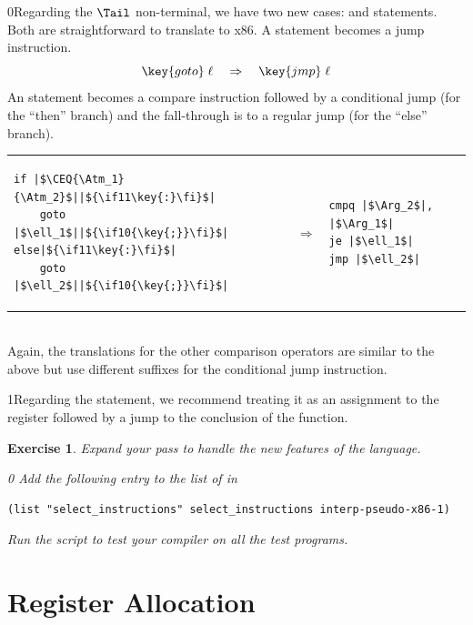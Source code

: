 \documentclass[7x10,nocrop]{TimesAPriori_MIT}%
\def\racketEd{0}
\def\pythonEd{1}
\def\edition{1}
\newcommand{\racket}[1]{{\if\edition\racketEd{#1}\fi}}
\newcommand{\python}[1]{{\if\edition\pythonEd #1\fi}}
\newtheorem{exercise}[theorem]{Exercise}
\begin{document}
\racket{Regarding the $\Tail$ non-terminal, we have two new cases:
  \key{goto} and \key{if} statements. Both are straightforward to
  translate to x86.}
%
A  statement becomes a jump instruction.
\[
\key{goto}\; \ell\racket{\key{;}} \quad \Rightarrow \quad \key{jmp}\;\ell
\]
%
An  statement becomes a compare instruction followed by a
conditional jump (for the ``then'' branch) and the fall-through is to
a regular jump (for the ``else'' branch).\\
\begin{tabular}{lll}
\begin{minipage}{0.4\textwidth}
\begin{lstlisting}
if |$\CEQ{\Atm_1}{\Atm_2}$||$\python{\key{:}}$|
    goto |$\ell_1$||$\racket{\key{;}}$|
else|$\python{\key{:}}$|
    goto |$\ell_2$||$\racket{\key{;}}$|
\end{lstlisting}
\end{minipage}
&
$\Rightarrow$
&
\begin{minipage}{0.4\textwidth}
\begin{lstlisting}
cmpq |$\Arg_2$|, |$\Arg_1$|
je |$\ell_1$|
jmp |$\ell_2$|
\end{lstlisting}
\end{minipage}
\end{tabular}  \\
Again, the translations for the other comparison operators are similar to the
above but use different suffixes for the conditional jump instruction.

\python{Regarding the  statement, we recommend treating it
  as an assignment to the \key{rax} register followed by a jump to the
  conclusion of the \code{main} function.}

\begin{exercise}\normalfont
Expand your  pass to handle the new
features of the \LangIf{} language.
%
{\if\edition\racketEd
Add the following entry to the list of  in
\begin{lstlisting}
(list "select_instructions" select_instructions interp-pseudo-x86-1)
\end{lstlisting}
\fi}
%
Run the script to test your compiler on all the test programs.
\end{exercise}

\section{Register Allocation}
\label{sec:register-allocation-Lif}
\end{document}

